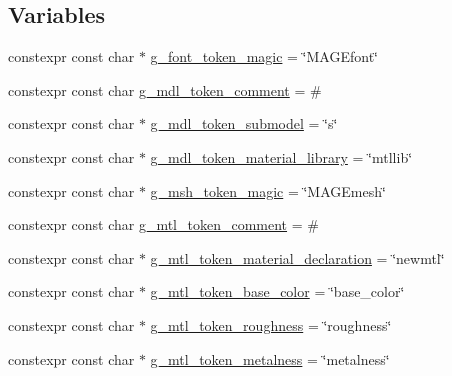 \subsection*{Variables}
\begin{DoxyCompactItemize}
\item 
constexpr const char $\ast$ \hyperlink{namespacemage_1_1rendering_1_1loader_a947052e9e29ddfbd7fbd4616315439b0}{g\+\_\+font\+\_\+token\+\_\+magic} = \char`\"{}M\+A\+G\+Efont\char`\"{}
\item 
constexpr const char \hyperlink{namespacemage_1_1rendering_1_1loader_accd79e03f94cc56cddd761a16d7d054e}{g\+\_\+mdl\+\_\+token\+\_\+comment} = \textquotesingle{}\#\textquotesingle{}
\item 
constexpr const char $\ast$ \hyperlink{namespacemage_1_1rendering_1_1loader_a3a2351be56243df9b8d5eb68f7f271bd}{g\+\_\+mdl\+\_\+token\+\_\+submodel} = \char`\"{}s\char`\"{}
\item 
constexpr const char $\ast$ \hyperlink{namespacemage_1_1rendering_1_1loader_adb56e9576f7d7684cc193d5f8b2a3af3}{g\+\_\+mdl\+\_\+token\+\_\+material\+\_\+library} = \char`\"{}mtllib\char`\"{}
\item 
constexpr const char $\ast$ \hyperlink{namespacemage_1_1rendering_1_1loader_a3308c71aa50caf9235118760684ad3da}{g\+\_\+msh\+\_\+token\+\_\+magic} = \char`\"{}M\+A\+G\+Emesh\char`\"{}
\item 
constexpr const char \hyperlink{namespacemage_1_1rendering_1_1loader_aa434371c99d44cc729773cec213def03}{g\+\_\+mtl\+\_\+token\+\_\+comment} = \textquotesingle{}\#\textquotesingle{}
\item 
constexpr const char $\ast$ \hyperlink{namespacemage_1_1rendering_1_1loader_a9633bbe8f29485e7bfa7cf5b709ebb1b}{g\+\_\+mtl\+\_\+token\+\_\+material\+\_\+declaration} = \char`\"{}newmtl\char`\"{}
\item 
constexpr const char $\ast$ \hyperlink{namespacemage_1_1rendering_1_1loader_a3734365e774517fec742e798d45e4c63}{g\+\_\+mtl\+\_\+token\+\_\+base\+\_\+color} = \char`\"{}base\+\_\+color\char`\"{}
\item 
constexpr const char $\ast$ \hyperlink{namespacemage_1_1rendering_1_1loader_a015526da8f15dd6d21e15237b02c31ca}{g\+\_\+mtl\+\_\+token\+\_\+roughness} = \char`\"{}roughness\char`\"{}
\item 
constexpr const char $\ast$ \hyperlink{namespacemage_1_1rendering_1_1loader_ac4f0b29e02f570fbb9ab2338f2074eb2}{g\+\_\+mtl\+\_\+token\+\_\+metalness} = \char`\"{}metalness\char`\"{}
\item 

\end{DoxyCompactItemize}
